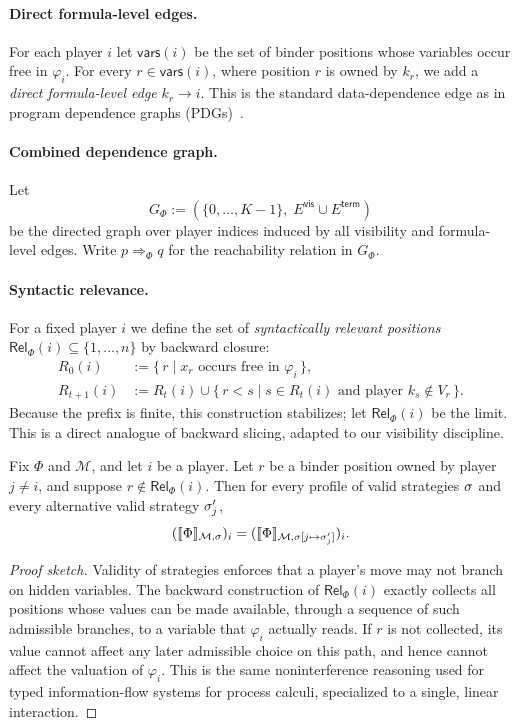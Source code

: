\paragraph{Direct formula-level edges.}
For each player $i$ let $\mathsf{vars}(i)$ be the set of binder positions whose variables occur free in $\varphi_i$.
For every $r \in \mathsf{vars}(i)$, where position $r$ is owned by $k_r$, we add a \emph{direct formula-level edge} $k_r \to i$.
This is the standard data-dependence edge as in program dependence graphs (PDGs)~\cite{ferrante1987program}.

\paragraph{Combined dependence graph.}
Let
\[
  G_\Phi := (\{0,\dots,K-1\},\; E^{\mathsf{vis}} \cup E^{\mathsf{term}})
\]
be the directed graph over player indices induced by all visibility and formula-level edges.
Write $p \Rightarrow_\Phi q$ for the reachability relation in $G_\Phi$.

\paragraph{Syntactic relevance.}
For a fixed player $i$ we define the set of \emph{syntactically relevant positions} $\mathsf{Rel}_\Phi(i) \subseteq \{1,\dots,n\}$ by backward closure:
\begin{align*}
  R_0(i) &:= \{\, r \mid x_r \text{ occurs free in } \varphi_i \,\},\\
  R_{t+1}(i) &:= R_t(i) \cup \{\, r < s \mid s \in R_t(i) \text{ and player } k_s \notin V_r \,\}.
\end{align*}
Because the prefix is finite, this construction stabilizes; let $\mathsf{Rel}_\Phi(i)$ be the limit.
This is a direct analogue of backward slicing, adapted to our visibility discipline.

\begin{lemma}
\label{lem:syntax-sound}
Fix $\Phi$ and $\mathcal M$, and let $i$ be a player.
Let $r$ be a binder position owned by player $j\neq i$, and suppose $r \notin \mathsf{Rel}_\Phi(i)$.
Then for every profile of valid strategies $\sigma$ and every alternative valid strategy $\sigma_j'$,
\[
  (\llbracket \Phi \rrbracket_{\mathcal M,\sigma})_i
  =
  (\llbracket \Phi \rrbracket_{\mathcal M,\sigma[j \mapsto \sigma_j']})_i.
\]
\end{lemma}
\begin{proof}[Proof sketch]
Validity of strategies enforces that a player's move may not branch on hidden variables.
The backward construction of $\mathsf{Rel}_\Phi(i)$ exactly collects all positions whose values can be made available, through a sequence of such admissible branches, to a variable that $\varphi_i$ actually reads.
If $r$ is not collected, its value cannot affect any later admissible choice on this path, and hence cannot affect the valuation of $\varphi_i$.
This is the same noninterference reasoning used for typed information-flow systems for process calculi, specialized to a single, linear interaction.
\end{proof}

